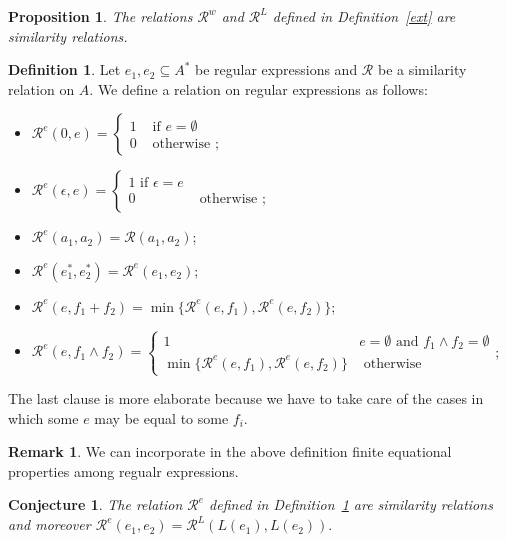\documentclass{article}
\theoremstyle{proposition}
\newtheorem{proposition}{Proposition}%
\newtheorem{conjecture}{Conjecture}
\theoremstyle{definition}%
\newtheorem{definition}{Definition}%
\newtheorem{remark}{Remark}%
\begin{document}
\begin{proposition}The relations ${\mathcal R}^w$ and ${\mathcal R}^L$ defined in Definition~\ref{ext} are similarity relations.
\end{proposition}


\begin{definition}\label{symexp} Let $e_1,e_2\subseteq A^*$ be regular expressions and  ${\mathcal R}$ be a similarity relation on $A$. We define a relation on regular expressions as follows:
\begin{itemize}
\item ${\mathcal R}^e(0,e) = \begin{cases} 1 & \mbox{ if } e=\emptyset\\
                                                        0 & \mbox{ otherwise };\end{cases}$
\item ${\mathcal R}^e(\epsilon,e) = \begin{cases} 1 \mbox{ if } \epsilon = e\\
0 & \mbox{ otherwise };\end{cases}$
\item ${\mathcal R}^e(a_1,a_2) = {\mathcal R}(a_1,a_2)$;
\item ${\mathcal R}^e(e_1^*,e_2^*) = {\mathcal R}^e(e_1,e_2)$;
\item ${\mathcal R}^e(e,f_1+f_2) = \min \{{\mathcal R}^e(e,f_1),{\mathcal R}^e(e,f_2)\}$;
\item ${\mathcal R}^e(e,f_1\wedge f_2) =\begin{cases} 1 &  e=\emptyset \mbox{ and } f_1\wedge f_2=\emptyset\\ \min \{{\mathcal R}^e(e,f_1),{\mathcal R}^e(e,f_2)\}& \mbox{ otherwise}\end{cases}$;
\end{itemize}
\end{definition}
\noindent The last clause is more elaborate because we have to take care of the cases in which some  $e$ may be equal to some $f_i$.

{\color{red} \begin{remark} We can incorporate in the above definition finite equational properties among regualr expressions.
\end{remark}}

\begin{conjecture}  The relation ${\mathcal R}^e$ defined in Definition~\ref{symexp} are similarity relations and moreover ${\mathcal R}^e(e_1,e_2)={\mathcal R}^L(L(e_1),L(e_2)).$
\end{conjecture}
\end{document}
